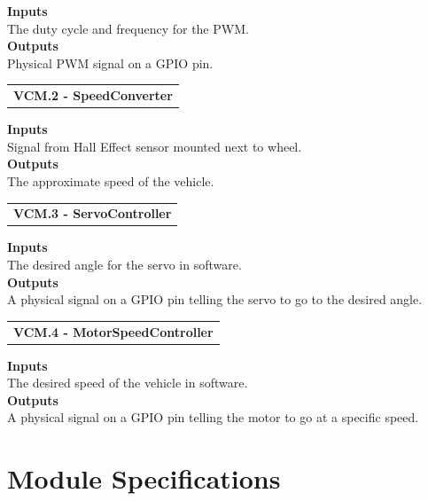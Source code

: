 \documentclass [10pt]{article}
\begin{document}
\textbf{Inputs} \\ The duty cycle and frequency for the PWM.
 \\

\textbf{Outputs} \\
Physical PWM signal on a GPIO pin. \\

\begin{longtable}{p{}}
\rowcolor{tableCell}\textbf{VCM.2 - SpeedConverter} \\
\end{longtable}

\textbf{Inputs} \\
Signal from Hall Effect sensor mounted next to wheel. \\

\textbf{Outputs} \\
The approximate speed of the vehicle. \\

\begin{longtable}{p{}}
\rowcolor{tableCell}\textbf{VCM.3 - ServoController} \\
\end{longtable}

\textbf{Inputs} \\
The desired angle for the servo in software. \\

\textbf{Outputs} \\
A physical signal on a GPIO pin telling the servo to go to the desired angle. \\

\begin{longtable}{p{}}
\rowcolor{tableCell}\textbf{VCM.4 - MotorSpeedController} \\
\end{longtable}

\textbf{Inputs} \\
The desired speed of the vehicle in software. \\

\textbf{Outputs} \\
A physical signal on a GPIO pin telling the motor to go at a specific speed. \\



\section{Module Specifications}
\end{document}
